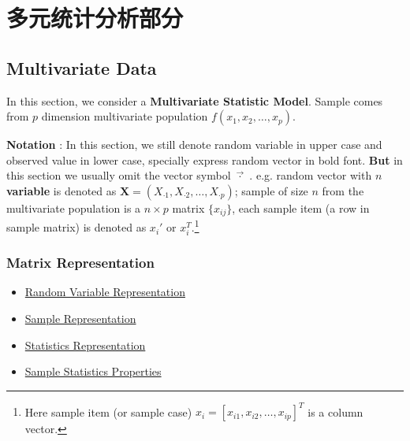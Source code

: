 \section{多元统计分析部分}\label{SecMultivariateStatisticalAnalysis}
\subsection{Multivariate Data}
    In this section, we consider a \textbf{Multivariate Statistic Model}. Sample comes from $p$ dimension multivariate population $f(x_1,x_2,\ldots,x_p)$.

    \textbf{Notation }: In this section, we still denote random variable in upper case and observed value in lower case, specially express random vector in bold font. \textbf{But} in this section we usually omit the vector symbol $ \vec{\cdot} \,\,$. e.g.
    random vector with $ n $ \textbf{variable }is denoted as $\mathbf{X}=(X_{\cdot 1},X_{\cdot 2},\ldots ,X_{\cdot p})$; sample of size $ n $ from the multivariate population is a $ n\times p $ matrix $ \{x_{ij}\} $, each sample item (a row in sample matrix) is denoted as $ x_i' $ or $ x_i^T $.\footnote{Here sample item (or sample case) $x_i=[x_{i1},x_{i2},\ldots,x_{ip}]^T$ is a column vector.} 


\subsubsection{Matrix Representation}


    \begin{itemize}[topsep=0pt,itemsep=1pt]
        \item \hyperlink{RandomVariableRepresentation}{Random Variable Representation}
        \item \hyperlink{SampleRepresentation}{Sample Representation}
        \item \hyperlink{StatisticsRepresentation}{Statistics Representation}
        \item \hyperlink{SampleStatisticsProperties}{Sample Statistics Properties}
    \end{itemize}
    



